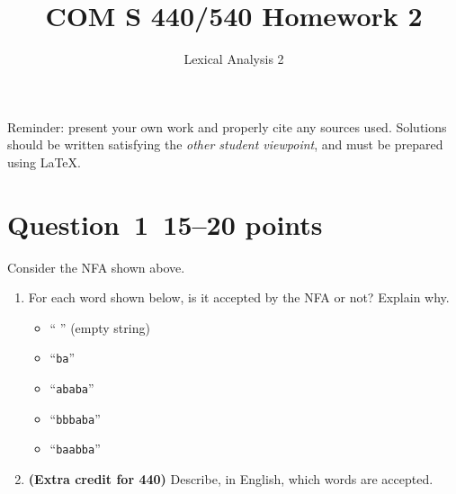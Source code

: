\documentclass[10pt]{article}
\title{COM S 440/540 Homework 2}
\date{}
\author{Lexical Analysis 2}
\renewcommand{\thepage}{~}
\begin{document}
\maketitle

\noindent
Reminder: present your own work and properly cite any sources used.
Solutions should be written satisfying the \emph{other student viewpoint},
and must be prepared using \LaTeX.
\renewcommand{\thepage}{~}

\section*{Question~1~\hfill 15--20 points}

\begin{center}
\end{center}
Consider the NFA shown above.
\begin{enumerate}
\item
For each word shown below, is it accepted by the NFA or not?
Explain why.
\begin{itemize}
\item `` '' (empty string)
\item ``{\tt ba}''
\item ``{\tt ababa}''
\item ``{\tt bbbaba}''
\item ``{\tt baabba}''
\end{itemize}

\item
{\bf (Extra credit for 440) }
Describe, in English, which words are accepted.
\end{enumerate}
\end{document}
